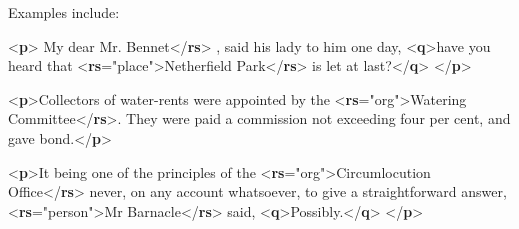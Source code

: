 Examples include: \par\bgroup{}\exampleFont \begin{shaded}\noindent\mbox{}{<\textbf{p}>}\mbox{}\newline 
{}My dear\mbox{}\newline 
{}Mr. Bennet{</\textbf{rs}>}\mbox{}\newline 
{}, said his lady to\mbox{}\newline 
 him one day, {<\textbf{q}>}have you heard that {<\textbf{rs}\hspace*{1em}{type}="{place}">}Netherfield Park{</\textbf{rs}>} is let at last?{</\textbf{q}>}\mbox{}\newline 
{</\textbf{p}>}\end{shaded}\egroup\par \noindent  \par\bgroup{}\exampleFont \begin{shaded}\noindent\mbox{}{<\textbf{p}>}Collectors of water-rents were appointed by the\mbox{}\newline 
{<\textbf{rs}\hspace*{1em}{type}="{org}">}Watering Committee{</\textbf{rs}>}.\mbox{}\newline 
 They were paid a commission not exceeding four per\mbox{}\newline 
 cent, and gave bond.{</\textbf{p}>}\end{shaded}\egroup\par \noindent  \par\bgroup{}\exampleFont \begin{shaded}\noindent\mbox{}{<\textbf{p}>}It being one of the principles of the\mbox{}\newline 
{<\textbf{rs}\hspace*{1em}{type}="{org}">}Circumlocution Office{</\textbf{rs}>} never, on any\mbox{}\newline 
 account whatsoever, to give a straightforward answer,\mbox{}\newline 
{<\textbf{rs}\hspace*{1em}{type}="{person}">}Mr Barnacle{</\textbf{rs}>} said, {<\textbf{q}>}Possibly.{</\textbf{q}>}\mbox{}\newline 
{</\textbf{p}>}\end{shaded}\egroup\par \par
